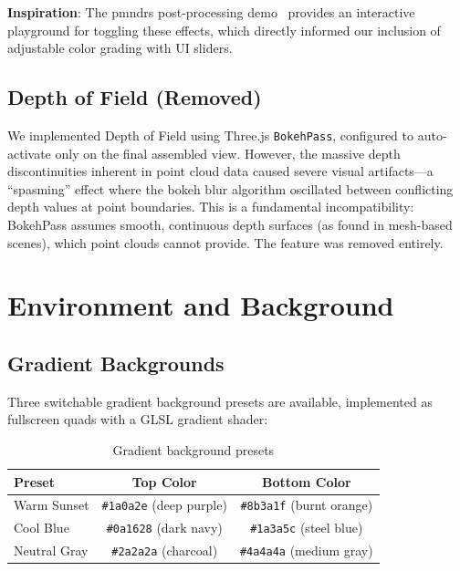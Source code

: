 \documentclass[11pt, letterpaper]{article}
\begin{document}
\textbf{Inspiration}: The pmndrs post-processing demo~\cite{pmndrs_postprocessing} provides an interactive playground for toggling these effects, which directly informed our inclusion of adjustable color grading with UI sliders.

\subsection{Depth of Field (Removed)}

We implemented Depth of Field using Three.js \texttt{BokehPass}, configured to auto-activate only on the final assembled view. However, the massive depth discontinuities inherent in point cloud data caused severe visual artifacts---a ``spasming'' effect where the bokeh blur algorithm oscillated between conflicting depth values at point boundaries. This is a fundamental incompatibility: BokehPass assumes smooth, continuous depth surfaces (as found in mesh-based scenes), which point clouds cannot provide. The feature was removed entirely.

\section{Environment and Background}

\subsection{Gradient Backgrounds}

Three switchable gradient background presets are available, implemented as fullscreen quads with a GLSL gradient shader:

\begin{table}[H]
\centering
\caption{Gradient background presets}
\begin{tabular}{@{}lcc@{}}
\toprule
\textbf{Preset} & \textbf{Top Color} & \textbf{Bottom Color} \\
\midrule
Warm Sunset & \texttt{\#1a0a2e} (deep purple) & \texttt{\#8b3a1f} (burnt orange) \\
Cool Blue & \texttt{\#0a1628} (dark navy) & \texttt{\#1a3a5c} (steel blue) \\
Neutral Gray & \texttt{\#2a2a2a} (charcoal) & \texttt{\#4a4a4a} (medium gray) \\
\bottomrule
\end{tabular}
\end{table}
\end{document}
